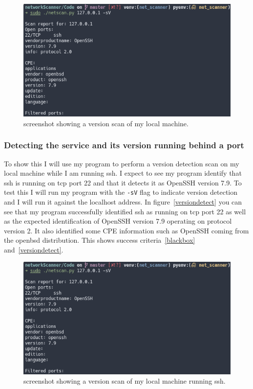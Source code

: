 \documentclass[titlepage]{article}
\let\Oldsubsubsection\subsubsection{}
\renewcommand{\subsubsection}{\FloatBarrier\Oldsubsubsection}
\begin{document}
\begin{figure}[H]
  \centering
  \includegraphics[width=\textwidth]{screenshots/sshversiondetect.png}
  \caption{%
    screenshot showing a version scan of my local machine.
  }\label{sshversiondetect}
\end{figure}

\subsubsection{Detecting the service and its version running behind a port}
To show this I will use my program to perform a version detection scan on my local machine
while I am running \gls{ssh}. I expect to see my program identify that \gls{ssh} is running
on \gls{tcp} port 22 and that it detects it as OpenSSH version 7.9. To test this
I will run my program with the \verb|-sV| flag to indicate version detection and
I will run it against the localhost address. In figure~\ref{versiondetect}
you can see that my program successfully identified \gls{ssh} as running on
\gls{tcp} port 22 as well as the expected identification of OpenSSH version 7.9
operating on protocol version 2.
It also identified some CPE information such as OpenSSH coming from the openbsd
distribution.
This shows success criteria~\ref{blackbox} and~\ref{versiondetect}.

\begin{figure}[H]
  \centering
  \includegraphics[width=\textwidth]{screenshots/sshversiondetect.png}
  \caption{%
    screenshot showing a version scan of my local machine running ssh.
  }\label{versiondetecttest}
\end{figure}
\end{document}
